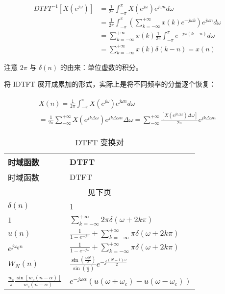 \documentclass[cn,11pt,chinese,black,simple]{elegantbook}
\begin{document}
\[
\begin{aligned}
D T F T^{-1}\left[X\left(e^{j \omega}\right)\right]&=\frac{1}{2 \pi} \int_{-\pi}^{\pi} X\left(e^{j \omega}\right) e^{j \omega n} d \omega \\
&=\frac{1}{2 \pi} \int_{-\pi}^{\pi}\left(\sum_{k=-\infty}^{+\infty} x(k) e^{-j \omega k}\right) e^{j \omega n} d \omega \\
&=\sum_{k=-\infty}^{+\infty} x(k) \frac{1}{2 \pi} \int_{-\pi}^{\pi} e^{-j \omega(k-n)} d \omega\\
&=\sum_{k=-\infty}^{+\infty} x(k) \delta(k-n)=x(n)
\end{aligned}
\]

注意  \(2\pi\) 与 \(\delta(n)\) 的由来：单位虚数的积分。

将 IDTFT 展开成累加的形式，实际上是将不同频率的分量逐个恢复：

\begin{align*}
    \begin{array}{l}
    X(n)=\frac{1}{2 \pi} \int_{-\pi}^{\pi} X\left(e^{j \omega}\right) e^{j \omega n} d \omega \\
    =\frac{1}{2 \pi} \sum_{-\infty}^{+\infty} X\left(e^{j k \Delta \omega}\right) e^{j k \Delta \omega n} \Delta \omega=\sum_{-\infty}^{+\infty} \frac{\left[X\left(e^{j k \Delta \omega}\right) \Delta \omega\right]}{2 \pi} e^{j k \Delta \omega n}
    \end{array}
\end{align*}

\begin{longtable}{ll} 
    \caption{DTFT 变换对} \\ 
    \toprule
    时域函数 & DTFT  \\
    \midrule
    \endfirsthead
    
    \toprule
    时域函数 & DTFT  \\
    \midrule
    \endhead 
  
    \hline
    \multicolumn{2}{c}{见下页}\\   \bottomrule
    \endfoot
  
    \bottomrule
    \endlastfoot
    \(\delta(n)\) & 1\\
    \(1\) & \(\sum_{k=-\infty}^{+\infty} 2 \pi \delta(\omega+2 k \pi)\) \\ 
    \(u(n)\) & \(\frac{1}{1-e^{-j \omega}}+\sum_{k=-\infty}^{+\infty} \pi \delta(\omega+2 k \pi)\)  \\
    \(e^{j\omega_0 n}\) & \(\frac{1}{1-e^{-j \omega}}+\sum_{k=-\infty}^{+\infty} \pi \delta(\omega+2 k \pi)\) \\
    \(W_N(n)\) & \(\frac{\sin \left(\frac{\omega N}{2}\right)}{\sin \left(\frac{\omega}{2}\right)} e^{-j \frac{(N-1) \omega}{2}}\) \\
    \(\frac{w_{c}}{\pi} \frac{\sin \left[w_{c}(n-\alpha)\right]}{w_{c}(n-\alpha)}\)  & \(e^{-j\omega\alpha} (u(\omega+\omega_c) - u(\omega-\omega_c))\)\\ 
\end{longtable}
\end{document}
